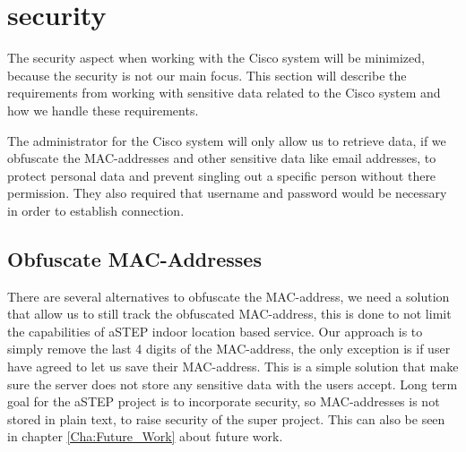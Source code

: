 \section{security}
The security aspect when working with the Cisco system will be minimized, because the security is not our main focus. This section will describe the requirements from working with sensitive data related to the Cisco system and how we handle these requirements.

The administrator for the Cisco system will only allow us to retrieve data, if we obfuscate the MAC-addresses and other sensitive data like email addresses, to protect personal data and prevent singling out a specific person without there permission. They also required that username and password would be necessary in order to establish connection. 

\subsection{Obfuscate MAC-Addresses}
There are several alternatives to obfuscate the MAC-address, we need a solution that allow us to still track the obfuscated MAC-address, this is done to not limit the capabilities of aSTEP indoor location based service. Our approach is to simply remove the last 4 digits of the MAC-address, the only exception is if user have agreed to let us save their MAC-address.
This is a simple solution that make sure the server does not store any sensitive data with the users accept. Long term goal for the aSTEP project is to incorporate security, so MAC-addresses is not stored in plain text, to raise security of the super project. This can also be seen in chapter \ref{Cha:Future_Work} about future work. 



